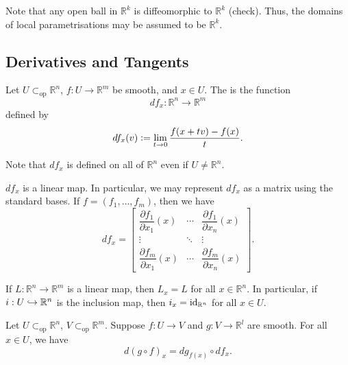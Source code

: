 \documentclass[12pt]{article}
\newcommand{\opsub}{\subset_{\operatorname{op}}}
\begin{document}
\begin{rem}
	Note that any open ball in $\mathbb{R}^{k}$ is diffeomorphic to $\mathbb{R}^{k}$ (check). Thus, the domains of local parametrisations may be assumed to be $\mathbb{R}^{k}$.
\end{rem}

\subsection{Derivatives and Tangents}

\begin{defn}
	Let $U \opsub \mathbb{R}^{n}$, $f : U \to \mathbb{R}^{m}$ be smooth, and $x \in U$. The  is the function
	\begin{equation*} 
		df_{x} : \mathbb{R}^{n} \to \mathbb{R}^{m}
	\end{equation*}
	defined by
	\begin{equation*} 
		df_{x}(v) \vcentcolon= \lim_{t \to 0} \frac{f(x + tv) - f(x)}{t}.
	\end{equation*}
\end{defn}
Note that $df_{x}$ is defined on all of $\mathbb{R}^{n}$ even if $U \neq \mathbb{R}^{n}$.

\begin{rem}
	$df_{x}$ is a linear map. In particular, we may represent $df_{x}$ as a matrix using the standard bases. If $f = (f_{1}, \ldots, f_{m})$, then we have
	\begin{equation*} 
		df_{x} = 
		\begin{bmatrix}
			\dfrac{\partial f_{1}}{\partial x_{1}}(x) & \cdots & \dfrac{\partial f_{1}}{\partial x_{n}}(x) \\
			\vdots & \ddots & \vdots \\
			\dfrac{\partial f_{m}}{\partial x_{1}}(x) & \cdots & \dfrac{\partial f_{m}}{\partial x_{n}}(x)
		\end{bmatrix}.
	\end{equation*}
\end{rem}

\begin{ex}
	If $L : \mathbb{R}^{n} \to \mathbb{R}^{m}$ is a linear map, then $L_{x} = L$ for all $x \in \mathbb{R}^{n}$. \newline
	In particular, if $i : U \hookrightarrow \mathbb{R}^{n}$ is the inclusion map, then $i_{x} = \operatorname{id}_{\mathbb{R}^{n}}$ for all $x \in U$.
\end{ex}

\begin{thm}
	Let $U \opsub \mathbb{R}^{n}$, $V \opsub \mathbb{R}^{m}$. Suppose $f : U \to V$ and $g : V \to \mathbb{R}^{l}$ are smooth. For all $x \in U$, we have
	\begin{equation*} 
		d(g \circ f)_{x} = dg_{f(x)} \circ df_{x}.
	\end{equation*}
\end{thm}
\end{document}

